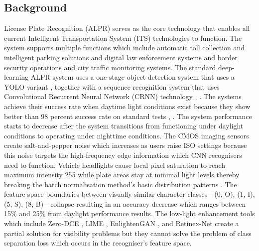 \documentclass{ieeeaccess}
\begin{document}
\subsection{Background}
 License Plate Recognition (ALPR) serves as the core technology that enables all current Intelligent Transportation System (ITS) technologies to function. The system supports multiple functions which include automatic toll collection and intelligent parking solutions and digital law enforcement systems and border security operations and city traffic monitoring systems. The standard deep-learning ALPR system uses a one-stage object detection system that uses a YOLO variant \cite{b15}, \cite{b16} together with a sequence recognition system that uses Convolutional Recurrent Neural Network (CRNN) technology \cite{b12}, \cite{b14}. The systems achieve their success rate when daytime light conditions exist because they show better than 98 percent success rate on standard tests \cite{b13}, \cite{b14}. The system performance starts to decrease after the system transitions from functioning under daylight conditions to operating under nighttime conditions. The CMOS imaging sensors create salt-and-pepper noise which increases as users raise ISO settings because this noise targets the high-frequency edge information which CNN recognisers need to function. Vehicle headlights cause local pixel saturation to reach maximum intensity 255 while plate areas stay at minimal light levels thereby breaking the batch normalisation method's basic distribution patterns \cite{b37}. The feature-space boundaries between visually similar character classes---(0, O), (1, I), (5, S), (8, B)---collapse resulting in an accuracy decrease which ranges between 15\% and 25\% from daylight performance results. The low-light enhancement tools which include Zero-DCE \cite{b2}, LIME \cite{b19}, EnlightenGAN \cite{b20}, and Retinex-Net \cite{b21} create a partial solution for visibility problems but they cannot solve the problem of class separation loss which occurs in the recogniser's feature space.
\end{document}
